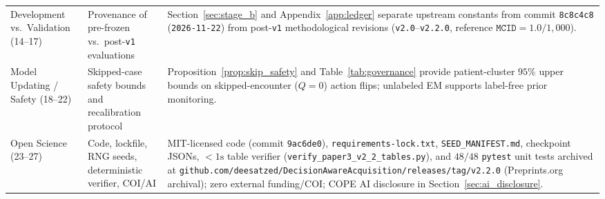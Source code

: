 \begin{table}[h!]
\begin{tabular}{>{\raggedright\arraybackslash}p{}>{\raggedright\arraybackslash}p{}>{\raggedright\arraybackslash}p{}}
Development vs.\ Validation (14--17) & Provenance of pre-frozen vs.\ post-\texttt{v1} evaluations & Section~\ref{sec:stage_b} and Appendix~\ref{app:ledger} separate upstream constants from commit \texttt{8c8c4c8} (\texttt{2026-11-22}) from post-\texttt{v1} methodological revisions (\texttt{v2.0}--\texttt{v2.2.0}, reference $\texttt{MCID}=1.0/1{,}000$). \\
Model Updating / Safety (18--22) & Skipped-case safety bounds and recalibration protocol & Proposition~\ref{prop:skip_safety} and Table~\ref{tab:governance} provide patient-cluster $95\%$ upper bounds on skipped-encounter ($Q=0$) action flips; unlabeled \citet{saerens2002adjusting} EM supports label-free prior monitoring. \\
Open Science (23--27) & Code, lockfile, RNG seeds, deterministic verifier, COI/AI & MIT-licensed code (commit \texttt{9ac6de0}), \texttt{requirements-lock.txt}, \texttt{SEED\_MANIFEST.md}, checkpoint JSONs, $<1\text{s}$ table verifier (\texttt{verify\_\allowbreak paper3\_\allowbreak v2\_2\_\allowbreak tables.py}), and $48/48$ \texttt{pytest} unit tests archived at \texttt{github.com/\allowbreak deesatzed/\allowbreak DecisionAwareAcquisition/\allowbreak releases/\allowbreak tag/v2.2.0} (Preprints.org archival); zero external funding/COI; COPE AI disclosure in Section~\ref{sec:ai_disclosure}. \\
\bottomrule
\end{tabular}
\end{table}
